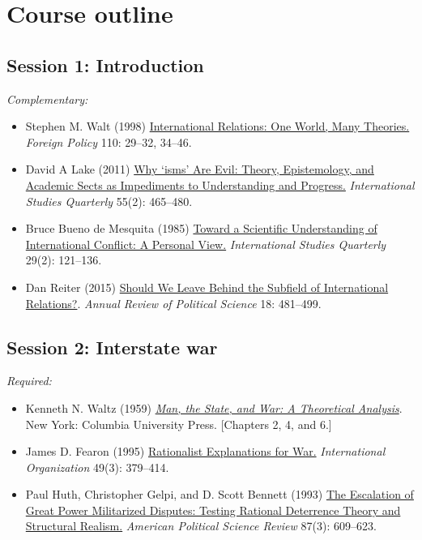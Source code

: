 \documentclass[12pt, a4paper]{article}
\begin{document}
\newpage
\section{Course outline}


\subsection*{Session 1: Introduction}

\noindent\textit{Complementary:}

\begin{itemize}
  \item Stephen M. Walt (1998) \href{https://doi.org/10.2307/1149275}{International Relations: One World, Many Theories.} \textit{Foreign Policy} 110: 29--32, 34--46.
  \item David A Lake (2011) \href{https://doi.org/10.1111/j.1468-2478.2011.00661.x}{Why `isms' Are Evil: Theory, Epistemology, and Academic Sects as Impediments to Understanding and Progress.} \textit{International Studies Quarterly} 55(2): 465--480.
  \item Bruce Bueno de Mesquita (1985) \href{https://doi.org/10.2307/2600500}{Toward a Scientific Understanding of International Conflict: A Personal View.} \textit{International Studies Quarterly} 29(2): 121--136.
	\item Dan Reiter (2015) \href{https://doi.org/10.1146/annurev-polisci-053013-041156}{Should We Leave Behind the Subfield of International Relations?}. \textit{Annual Review of Political Science} 18: 481--499.
\end{itemize}


\vspace{20pt}
\hline
\subsection*{Session 2: Interstate war}

\noindent\textit{Required:}

\begin{itemize}
  \item Kenneth N. Waltz (1959) \href{https://cup.columbia.edu/book/man-the-state-and-war/9780231188043}{\textit{Man, the State, and War: A Theoretical Analysis}}. New York: Columbia University Press. [Chapters 2, 4, and 6.]
  \item James D. Fearon (1995) \href{https://doi.org/10.1017/S0020818300033324}{Rationalist Explanations for War.} \textit{International Organization} 49(3): 379--414.
  \item Paul Huth, Christopher Gelpi, and D. Scott Bennett (1993) \href{https://doi.org/10.2307/2938739}{The Escalation of Great Power Militarized Disputes: Testing Rational Deterrence Theory and Structural Realism.} \textit{American Political Science Review} 87(3): 609--623.
\end{itemize}
\end{document}
